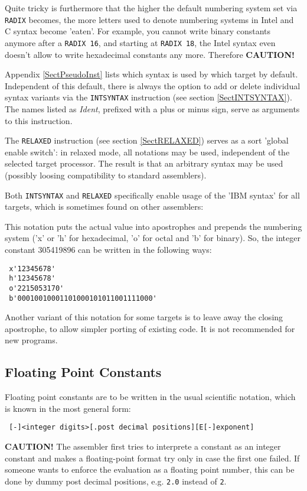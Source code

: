 \documentclass[12pt,twoside]{report}
\newcommand{\ii}[1]{{\it #1}}
\newcommand{\bb}[1]{{\bf #1}}
\newcommand{\tty}[1]{{\tt #1}}
\begin{document}
Quite tricky is furthermore that the higher the default numbering system
set via {\tt RADIX} becomes, the more letters used to denote numbering
systems in Intel and C syntax become 'eaten'.  For example, you cannot
write binary constants anymore after a {\tt RADIX 16}, and starting at
{\tt RADIX 18}, the Intel syntax even doesn't allow to write hexadecimal
constants any more.  Therefore {\bf CAUTION!}

Appendix \ref{SectPseudoInst} lists which syntax is used by which target
by default.  Independent of this default, there is always the option to
add or delete individual syntax variants via the \tty{INTSYNTAX} instruction
(see section \ref{SectINTSYNTAX}).  The names listed as \ii{Ident},
prefixed with a plus or minus sign, serve as arguments to this instruction.

The \tty{RELAXED} instruction (see section \ref{SectRELAXED}) serves as
a sort 'global enable switch': in relaxed mode, all notations may be used,
independent of the selected target processor.  The result is that an arbitrary
syntax may be used (possibly loosing compatibility to standard assemblers).

Both \tty{INTSYNTAX} and \tty{RELAXED} specifically enable usage of the
'IBM syntax' for all targets, which is sometimes found on other assemblers:

This notation puts the actual value into apostrophes and prepends
the numbering system ('x' or 'h' for hexadecimal, 'o' for octal and 'b'
for binary).  So, the integer constant 305419896 can be written in the
following ways:
\begin{verbatim}
 x'12345678'
 h'12345678'
 o'2215053170'
 b'00010010001101000101011001111000'
\end{verbatim}
Another variant of this notation for some targets is to leave away the
closing apostrophe, to allow simpler porting of existing code.  It is
not recommended for new programs.

\subsection{Floating Point Constants}

Floating point constants are to be written in the usual scientific
notation, which is known in the most general form:
\begin{verbatim}
 [-]<integer digits>[.post decimal positions][E[-]exponent]
\end{verbatim}
\bb{CAUTION!} The assembler first tries to interprete a constant as an
integer constant and makes a floating-point format try only in case
the first one failed.  If someone wants to enforce the evaluation as
a floating point number, this can be done by dummy post decimal
positions, e.g.  \tty{2.0} instead of \tty{2}.
\end{document}
